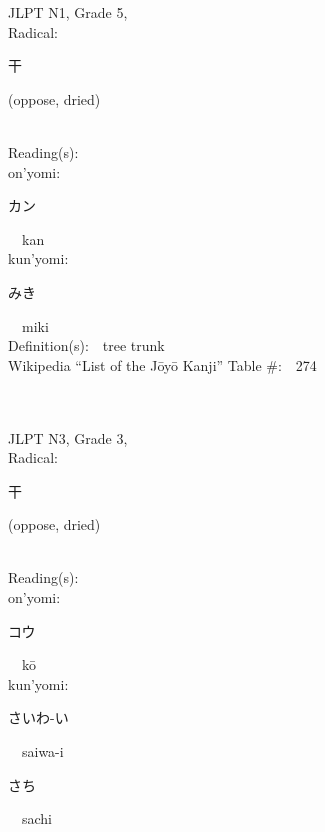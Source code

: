 \begin{multicols}{2}
{JLPT N1, Grade 5, \\Radical:\ \ {\begin{CJK}{UTF8}{min} 干 \end{CJK}} (oppose, dried) } \\
Reading(s):\ \ \\
{\hspace*{1em}}on'yomi:\ \ \\
{\hspace*{2em}}{\begin{CJK}{UTF8}{min} カン \end{CJK}}\ \ kan\ \ \\
{\hspace*{1em}}kun'yomi:\ \ \\
{\hspace*{2em}}{\begin{CJK}{UTF8}{min} みき \end{CJK}}\ \ miki\ \ \\
Definition(s):\ \ tree trunk \\
Wikipedia ``List of the J\=oy\=o Kanji'' Table \#:\ \ 274 \\
\ \ \\
{\fontsize{34pt}{40pt}  }\ \ \\  %
{JLPT N3, Grade 3, \\Radical:\ \ {\begin{CJK}{UTF8}{min} 干 \end{CJK}} (oppose, dried) } \\
Reading(s):\ \ \\
{\hspace*{1em}}on'yomi:\ \ \\
{\hspace*{2em}}{\begin{CJK}{UTF8}{min} コウ \end{CJK}}\ \ k\=o\ \ \\
{\hspace*{1em}}kun'yomi:\ \ \\
{\hspace*{2em}}{\begin{CJK}{UTF8}{min} さいわ-い \end{CJK}}\ \ saiwa-i\ \ \\
{\hspace*{2em}}{\begin{CJK}{UTF8}{min} さち \end{CJK}}\ \ sachi\ \ \\

\end{multicols}
